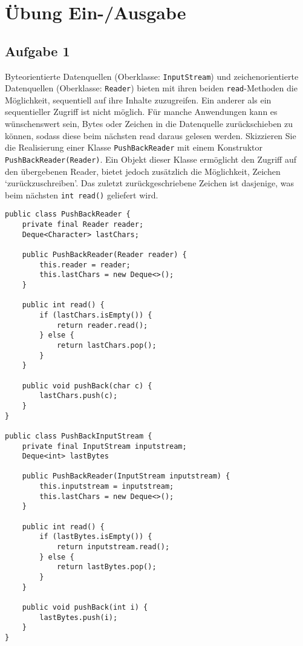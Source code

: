 \chapter{Übung Ein-/Ausgabe}

\section{Aufgabe 1}
Byteorientierte Datenquellen (Oberklasse:
\lstinline{InputStream}) und zeichenorientierte Datenquellen (Oberklasse: \lstinline{Reader})
bieten mit ihren beiden \lstinline{read}-Methoden die Möglichkeit, sequentiell
auf ihre Inhalte zuzugreifen. Ein anderer als ein sequentieller Zugriff ist
nicht möglich. Für manche Anwendungen kann es wünschenswert sein, Bytes oder
Zeichen in die Datenquelle zurückschieben zu können, sodass diese beim nächsten
read daraus gelesen werden. Skizzieren Sie die Realisierung einer Klasse
\lstinline{PushBackReader} mit einem Konstruktor
\lstinline{PushBackReader(Reader)}. Ein Objekt dieser Klasse ermöglicht den
Zugriff auf den übergebenen Reader, bietet jedoch zusätzlich die Möglichkeit,
Zeichen `zurückzuschreiben'. Das zuletzt zurückgeschriebene Zeichen ist
dasjenige, was beim nächsten \lstinline{int read()} geliefert wird.

\begin{lstlisting}
public class PushBackReader {
    private final Reader reader;
    Deque<Character> lastChars;

    public PushBackReader(Reader reader) {
        this.reader = reader;
        this.lastChars = new Deque<>();
    }

    public int read() {
        if (lastChars.isEmpty()) {
            return reader.read();
        } else {
            return lastChars.pop();
        }
    }

    public void pushBack(char c) {
        lastChars.push(c);
    }
}

public class PushBackInputStream {
    private final InputStream inputstream;
    Deque<int> lastBytes

    public PushBackReader(InputStream inputstream) {
        this.inputstream = inputstream;
        this.lastChars = new Deque<>();
    }

    public int read() {
        if (lastBytes.isEmpty()) {
            return inputstream.read();
        } else {
            return lastBytes.pop();
        }
    }

    public void pushBack(int i) {
        lastBytes.push(i);
    }
}
\end{lstlisting}

